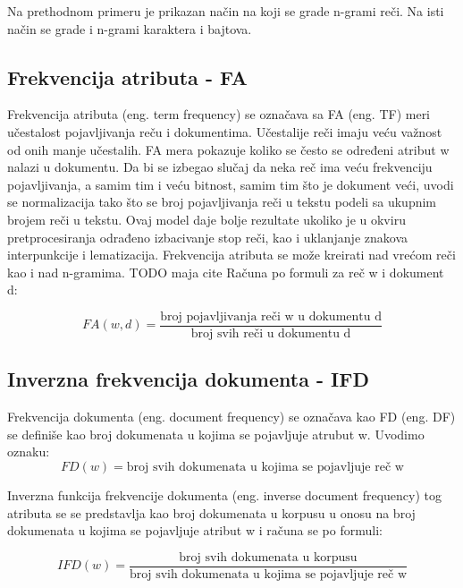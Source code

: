 \documentclass[12pt,oneside]{memoir}
\begin{document}
Na prethodnom primeru je prikazan način na koji se grade n-grami reči. Na isti način se grade i n-grami karaktera i bajtova.  
\subsection{Frekvencija atributa - FA}

Frekvencija atributa (eng. term frequency) se označava sa FA (eng. TF) meri učestalost pojavljivanja reču i dokumentima.  Učestalije reči imaju veću važnost od onih manje učestalih.  FA mera pokazuje koliko se često se određeni atribut w nalazi u dokumentu. 
 Da bi se izbegao slučaj da neka reč ima veću frekvenciju pojavljivanja, a samim tim i veću bitnost, samim tim što je dokument veći, uvodi se normalizacija tako što se broj pojavljivanja reči u tekstu podeli sa ukupnim brojem reči u tekstu.  Ovaj model daje bolje rezultate ukoliko je u okviru pretprocesiranja odrađeno izbacivanje stop reči, kao i uklanjanje znakova interpunkcije i lematizacija.  Frekvencija atributa se može kreirati nad vrećom reči kao i nad n-gramima.  TODO maja cite
Računa po formuli za reč w i dokument d:

\begin{equation}
	FA(w,d) = \frac{\text{broj pojavljivanja reči w u dokumentu d}}{\text{broj svih reči u dokumentu d}}
\end{equation}

\subsection{Inverzna frekvencija dokumenta - IFD}

Frekvencija dokumenta (eng.  document frequency) se označava kao FD (eng.  DF) se definiše kao broj dokumenata u kojima se pojavljuje atrubut w.  Uvodimo oznaku:
\begin{equation}
	FD(w) = \text{broj svih dokumenata u kojima se pojavljuje reč w}
\end{equation}

Inverzna funkcija frekvencije dokumenta (eng.  inverse document frequency) tog atributa se se predstavlja kao broj dokumenata u korpusu u onosu na broj dokumenata u kojima se pojavljuje atribut w i računa se po formuli:

\begin{equation}
	IFD(w) = \frac{\text{broj svih dokumenata u korpusu}}{\text{broj svih dokumenata u kojima se pojavljuje reč w}}
\end{equation}
\end{document}
